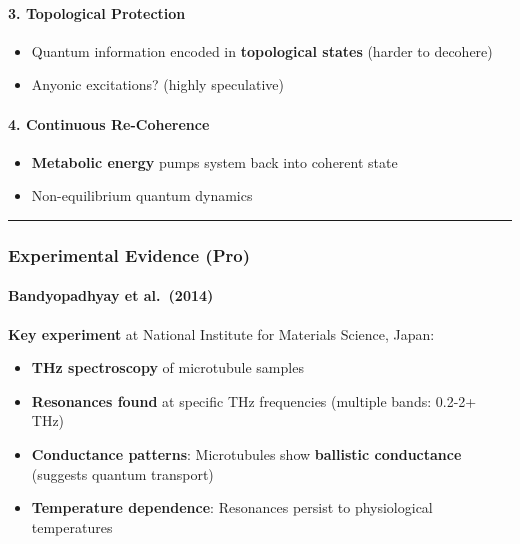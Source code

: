 \paragraph{3. Topological Protection}\label{topological-protection}

\begin{itemize}
\tightlist
\item
  Quantum information encoded in \textbf{topological states} (harder to
  decohere)
\item
  Anyonic excitations? (highly speculative)
\end{itemize}

\paragraph{4. Continuous Re-Coherence}\label{continuous-re-coherence}

\begin{itemize}
\tightlist
\item
  \textbf{Metabolic energy} pumps system back into coherent state
\item
  Non-equilibrium quantum dynamics
\end{itemize}

\begin{center}\rule{0.5\linewidth}{0.5pt}\end{center}

\subsubsection{Experimental Evidence
(Pro)}\label{experimental-evidence-pro}

\paragraph{Bandyopadhyay et al.~(2014)}\label{bandyopadhyay-et-al.-2014}

\textbf{Key experiment} at National Institute for Materials Science,
Japan:

\begin{itemize}
\tightlist
\item
  \textbf{THz spectroscopy} of microtubule samples
\item
  \textbf{Resonances found} at specific THz frequencies (multiple bands:
  0.2-2+ THz)
\item
  \textbf{Conductance patterns}: Microtubules show \textbf{ballistic
  conductance} (suggests quantum transport)
\item
  \textbf{Temperature dependence}: Resonances persist to physiological
  temperatures
\end{itemize}

